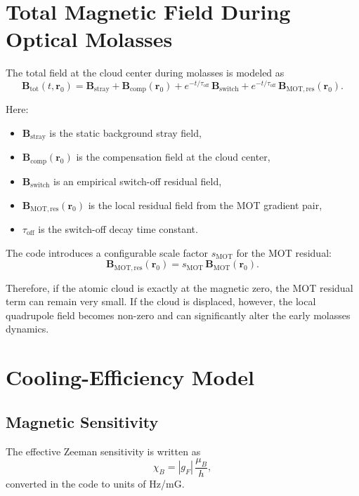 \documentclass[12pt,a4paper]{article}
\begin{document}
\section{Total Magnetic Field During Optical Molasses}

The total field at the cloud center during molasses is modeled as
\begin{equation}
  \bm{B}_{\mathrm{tot}}(t,\bm{r}_0)
  =
  \bm{B}_{\mathrm{stray}}
  +
  \bm{B}_{\mathrm{comp}}(\bm{r}_0)
  +
  e^{-t/\tau_{\mathrm{off}}}\,\bm{B}_{\mathrm{switch}}
  +
  e^{-t/\tau_{\mathrm{off}}}\,\bm{B}_{\mathrm{MOT,res}}(\bm{r}_0).
\end{equation}

Here:
\begin{itemize}
  \item $\bm{B}_{\mathrm{stray}}$ is the static background stray field,
  \item $\bm{B}_{\mathrm{comp}}(\bm{r}_0)$ is the compensation field at the cloud center,
  \item $\bm{B}_{\mathrm{switch}}$ is an empirical switch-off residual field,
  \item $\bm{B}_{\mathrm{MOT,res}}(\bm{r}_0)$ is the local residual field from the MOT gradient pair,
  \item $\tau_{\mathrm{off}}$ is the switch-off decay time constant.
\end{itemize}

The code introduces a configurable scale factor $s_{\mathrm{MOT}}$ for the MOT residual:
\begin{equation}
  \bm{B}_{\mathrm{MOT,res}}(\bm{r}_0) =
  s_{\mathrm{MOT}}\,\bm{B}_{\mathrm{MOT}}(\bm{r}_0).
\end{equation}

Therefore, if the atomic cloud is exactly at the magnetic zero, the MOT residual term can remain very small. If the cloud is displaced, however, the local quadrupole field becomes non-zero and can significantly alter the early molasses dynamics.

\section{Cooling-Efficiency Model}

\subsection{Magnetic Sensitivity}

The effective Zeeman sensitivity is written as
\begin{equation}
  \chi_B = |g_F|\,\frac{\mu_B}{h},
\end{equation}
converted in the code to units of \si{Hz/mG}.
\end{document}
